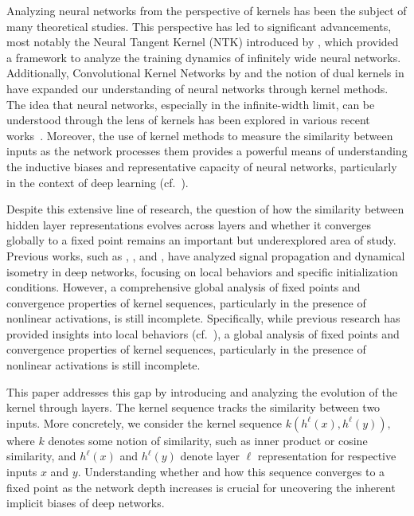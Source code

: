 \documentclass[twoside]{article}
\theoremstyle{definition}
\begin{document}
Analyzing neural networks from the perspective of kernels has been the subject of many theoretical studies. This perspective has led to significant advancements, most notably the Neural Tangent Kernel (NTK) introduced by \citet{jacot2018neural}, which provided a framework to analyze the training dynamics of infinitely wide neural networks. Additionally, Convolutional Kernel Networks by \citet{mairal2014convolutional} and the notion of dual kernels in \citet{daniely2016toward} have expanded our understanding of neural networks through kernel methods. The idea that neural networks, especially in the infinite-width limit, can be understood through the lens of kernels has been explored in various recent works~\citep{lee2019wide, arora2019exact, yang2019scaling}. Moreover, the use of kernel methods to measure the similarity between inputs as the network processes them provides a powerful means of understanding the inductive biases and representative capacity of neural networks, particularly in the context of deep learning (cf.~\citep{zhang2017understanding,zhang2021understanding,cho2009kernel}).

Despite this extensive line of research, the question of how the similarity between hidden layer representations evolves across layers and whether it converges globally to a fixed point remains an important but underexplored area of study. Previous works, such as \citet{saxe2013exact}, \citet{schoenholz2016deep}, and \citet{pennington2017resurrecting}, have analyzed signal propagation and dynamical isometry in deep networks, focusing on local behaviors and specific initialization conditions. However, a comprehensive global analysis of fixed points and convergence properties of kernel sequences, particularly in the presence of nonlinear activations, is still incomplete. Specifically, while previous research has provided insights into local behaviors (cf.~\citep{yang2019meanfield}), a global analysis of fixed points and convergence properties of kernel sequences, particularly in the presence of nonlinear activations is still incomplete.

This paper addresses this gap by introducing and analyzing the evolution of the kernel through layers. The kernel sequence tracks the similarity between two inputs. More concretely, we consider the kernel sequence $k(h^\ell(x), h^\ell(y)),$ where $k$ denotes some notion of similarity, such as inner product or cosine similarity, and $h^\ell(x)$ and $h^\ell(y)$ denote layer $\ell$ representation for respective inputs $x$ and $y$. Understanding whether and how this sequence converges to a fixed point as the network depth increases is crucial for uncovering the inherent implicit biases of deep networks.
\end{document}
